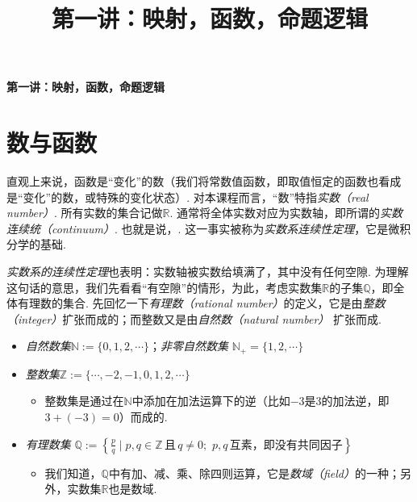 \documentclass{article}
\date{}
\title{第一讲：映射，函数，命题逻辑}
\begin{document}
\maketitle

 \renewcommand\contentsname{目录}
 
\tableofcontents

\newpage

 \begin{center}
     {\Large \textbf{第一讲：映射，函数，命题逻辑}}
\end{center}

\section{数与函数}

直观上来说，函数是“变化”的数（我们将常数值函数，即取值恒定的函数也看成是“变化”的数，或特殊的变化状态）. 对本课程而言，“数”特指\textit{实数（real number）}. 所有实数的集合记做$\mathbb{R}$. 通常将全体实数对应为实数轴，即所谓的\textit{实数连续统（continuum）}. 也就是说，. 这一事实被称为\textit{实数系连续性定理}，它是微积分学的基础. 

\vspace{4pt}

\textit{实数系的连续性定理}也表明：实数轴被实数给填满了，其中没有任何空隙. 为理解这句话的意思，我们先看看“有空隙”的情形，为此，考虑实数集$\mathbb{R}$的子集$\mathbb{Q}$，即全体有理数的集合. 先回忆一下\textit{有理数（rational number）}的定义，它是由\textit{整数（integer）}扩张而成的；而整数又是由\textit{自然数（natural number）} 扩张而成. 

\begin{itemize}
    \item \textit{自然数集}$\mathbb{N}:=\{0,1,2,\cdots\}$；\textit{非零自然数集} $\mathbb{N}_{+}=\{1,2,\cdots\}$
    \item \textit{整数集}$\mathbb{Z}:=\{\cdots,-2,-1,0,1,2,\cdots\}$
    \begin{itemize}
        \item 整数集是通过在$\mathbb{N}$中添加在加法运算下的逆（比如$-3$是$3$的加法逆，即$3+(-3)=0$）而成的.
    \end{itemize}
    \item \textit{有理数集} $\mathbb{Q}:=\left\{\frac{p}{q}\mid p,q\in \mathbb{Z}\,\textit{且}\,q\neq 0;\,\,p,q\,\textit{互素，即没有共同因子}\right\}$
    \begin{itemize}
        \item 我们知道，$\mathbb{Q}$中有加、减、乘、除四则运算，它是\textit{数域（field）}的一种；另外，实数集$\mathbb{R}$也是数域. 
    \end{itemize}
\end{itemize}
\end{document}
